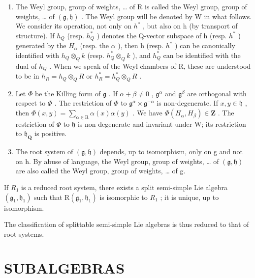\begin{enumerate}
\def\labelenumi{\arabic{enumi})}
\setcounter{enumi}{9}
\item
  The Weyl group, group of weights, \ldots{} of R is called the Weyl group, group of weights, \ldots{} of \((\mathfrak{g},\mathfrak{h})\) . The Weyl group will be denoted by W in what follows. We consider its operation, not only on \(h^{*}\) , but also on h (by transport of structure). If \(h_{Q}\) (resp. \(h_{Q}^{*}\) ) denotes the Q-vector subspace of h (resp. \(h^{*}\) ) generated by the \(H_{\alpha}\) (resp. the \(\alpha\) ), then h (resp. \(h^{*}\) ) can be canonically identified with \(h_{Q} \otimes_{Q} k\) (resp. \(h_{Q}^{*} \otimes_{Q} k\) ), and \(h_{Q}^{*}\) can be identified with the dual of \(h_{Q}\) . When we speak of the Weyl chambers of R, these are understood to be in \(h_{R} = h_{Q} \otimes_{Q} R\) or \(h_{R}^{*} = h_{Q}^{*} \otimes_{Q} R\) .
\item
  Let \(\varPhi\) be the Killing form of \(\mathfrak{g}\) . If \(\alpha + \beta \neq 0\) , \(\mathfrak{g}^{\alpha}\) and \(\mathfrak{g}^{\beta}\) are orthogonal with respect to \(\varPhi\) . The restriction of \(\varPhi\) to \(\mathfrak{g}^{\alpha} \times \mathfrak{g}^{-\alpha}\) is non-degenerate. If \(x, y \in \mathfrak{h}\) , then \(\varPhi(x, y) = \sum_{\alpha \in \mathrm{R}} \alpha(x)\alpha(y)\) . We have \(\varPhi(H_{\alpha}, H_{\beta}) \in \mathbf{Z}\) . The restriction of \(\varPhi\) to \(\mathfrak{h}\) is non-degenerate and invariant under W; its restriction to \(\mathfrak{h}_{\mathbf{Q}}\) is positive.
\item
  The root system of \((\mathfrak{g},\mathfrak{h})\) depends, up to isomorphism, only on g and not on h. By abuse of language, the Weyl group, group of weights, \ldots{} of \((\mathfrak{g},\mathfrak{h})\) are also called the Weyl group, group of weights, \ldots{} of g.
\end{enumerate}

If \(R_{1}\) is a reduced root system, there exists a split semi-simple Lie algebra \((\mathfrak{g}_{1},\mathfrak{h}_{1})\) such that \(\mathrm{R}(\mathfrak{g}_{1},\mathfrak{h}_{1})\) is isomorphic to \(R_{1}\) ; it is unique, up to isomorphism.

The classification of splittable semi-simple Lie algebras is thus reduced to that of root systems.

\section*{SUBALGEBRAS}

